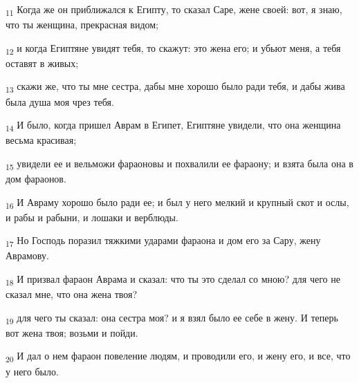 \begin{tcolorbox}
\textsubscript{11} Когда же он приближался к Египту, то сказал Саре, жене своей: вот, я знаю, что ты женщина, прекрасная видом;
\end{tcolorbox}
\begin{tcolorbox}
\textsubscript{12} и когда Египтяне увидят тебя, то скажут: это жена его; и убьют меня, а тебя оставят в живых;
\end{tcolorbox}
\begin{tcolorbox}
\textsubscript{13} скажи же, что ты мне сестра, дабы мне хорошо было ради тебя, и дабы жива была душа моя чрез тебя.
\end{tcolorbox}
\begin{tcolorbox}
\textsubscript{14} И было, когда пришел Аврам в Египет, Египтяне увидели, что она женщина весьма красивая;
\end{tcolorbox}
\begin{tcolorbox}
\textsubscript{15} увидели ее и вельможи фараоновы и похвалили ее фараону; и взята была она в дом фараонов.
\end{tcolorbox}
\begin{tcolorbox}
\textsubscript{16} И Авраму хорошо было ради ее; и был у него мелкий и крупный скот и ослы, и рабы и рабыни, и лошаки и верблюды.
\end{tcolorbox}
\begin{tcolorbox}
\textsubscript{17} Но Господь поразил тяжкими ударами фараона и дом его за Сару, жену Аврамову.
\end{tcolorbox}
\begin{tcolorbox}
\textsubscript{18} И призвал фараон Аврама и сказал: что ты это сделал со мною? для чего не сказал мне, что она жена твоя?
\end{tcolorbox}
\begin{tcolorbox}
\textsubscript{19} для чего ты сказал: она сестра моя? и я взял было ее себе в жену. И теперь вот жена твоя; возьми и пойди.
\end{tcolorbox}
\begin{tcolorbox}
\textsubscript{20} И дал о нем фараон повеление людям, и проводили его, и жену его, и все, что у него было.
\end{tcolorbox}
